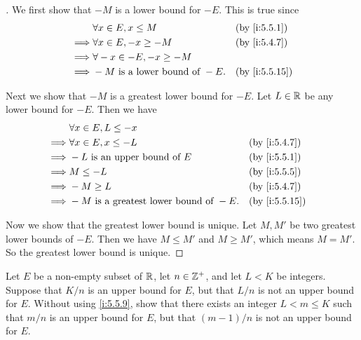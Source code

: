 \begin{proof}[]
  We first show that \(-M\) is a lower bound for \(-E\).
  This is true since
  \begin{align*}
             & \forall x \in E, x \leq M           &  & \by{i:5.5.1}  \\
    \implies & \forall x \in E, -x \geq -M         &  & \by{i:5.4.7}  \\
    \implies & \forall -x \in -E, -x \geq -M                          \\
    \implies & -M \text{ is a lower bound of } -E. &  & \by{i:5.5.15}
  \end{align*}

  Next we show that \(-M\) is a greatest lower bound for \(-E\).
  Let \(L \in \mathbb{R}\) be any lower bound for \(-E\).
  Then we have
  \begin{align*}
             & \forall x \in E, L \leq -x                                      \\
    \implies & \forall x \in E, x \leq -L                   &  & \by{i:5.4.7}  \\
    \implies & -L \text{ is an upper bound of } E           &  & \by{i:5.5.1}  \\
    \implies & M \leq -L                                    &  & \by{i:5.5.5}  \\
    \implies & -M \geq L                                    &  & \by{i:5.4.7}  \\
    \implies & -M \text{ is a greatest lower bound of } -E. &  & \by{i:5.5.15}
  \end{align*}

  Now we show that the greatest lower bound is unique.
  Let \(M, M'\) be two greatest lower bounds of \(-E\).
  Then we have \(M \leq M'\) and \(M \geq M'\), which means \(M = M'\).
  So the greatest lower bound is unique.
\end{proof}

\begin{ex}\label{i:ex:5.5.2}
  Let \(E\) be a non-empty subset of \(\mathbb{R}\), let \(n \in \mathbb{Z}^+\), and let \(L < K\) be integers.
  Suppose that \(K / n\) is an upper bound for \(E\), but that \(L / n\) is not an upper bound for \(E\).
  Without using \cref{i:5.5.9}, show that there exists an integer \(L < m \leq K\) such that \(m / n\) is an upper bound for \(E\), but that \((m - 1) / n\) is not an upper bound for \(E\).
\end{ex}

